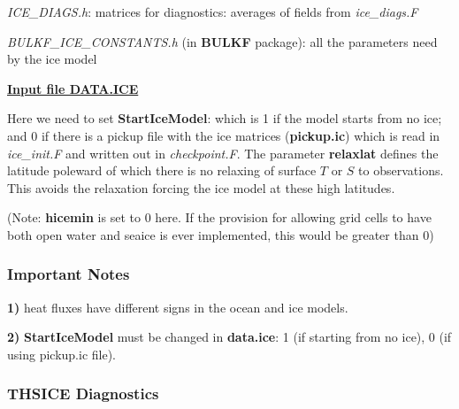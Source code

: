 \noindent
{\it ICE\_DIAGS.h}: matrices for diagnostics: averages of fields
from {\it ice\_diags.F}

\noindent
{\it BULKF\_ICE\_CONSTANTS.h} (in {\bf BULKF} package): 
all the parameters need by the ice model

\vspace{1cm}

\noindent
{\bf {\underline{Input file DATA.ICE}}}

\noindent
Here we need to set {\bf StartIceModel}: which is 1 if the
model starts from no ice; and 0 if there is a pickup file
with the ice matrices ({\bf pickup.ic}) which is read
in {\it ice\_init.F} and written out in {\it checkpoint.F}.
The parameter {\bf relaxlat} defines the latitude poleward
of which there is no relaxing of surface $T$ or $S$ to
observations. This avoids the relaxation forcing the ice
model at these high latitudes.

\noindent
({\tiny Note: {\bf hicemin} is set to 0 here. If the
provision for allowing grid cells to have both
open water and seaice is ever implemented, this would
be greater than 0})

\vspace{1cm}

\subsubsection{Important Notes}

\noindent
{\bf 1)} heat fluxes have different signs in the ocean and ice
models.

\noindent
{\bf 2)} {\bf StartIceModel} must be changed in {\bf data.ice}:
1 (if starting from no ice), 0 (if using pickup.ic file).


\subsubsection{THSICE Diagnostics}
\label{sec:pkg:thsice:diagnostics}

